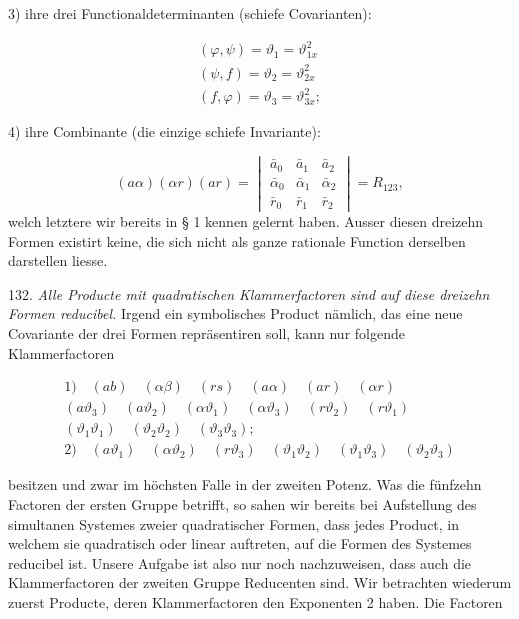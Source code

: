 \documentclass[11pt]{article}
\providecommand{\weberpage}[1]{}
\providecommand{\weq}[2]{\begin{equation}\tag{#1}#2\end{equation}}
\begin{document}
3) ihre drei Functionaldeterminanten (schiefe Covarianten):

\[
\begin{gathered}
(\varphi,\psi) = \vartheta_1 = \vartheta_{1x}^2\\
(\psi,f) = \vartheta_2 = \vartheta_{2x}^2\\
(f,\varphi) = \vartheta_3 = \vartheta_{3x}^2;
\end{gathered}
\]


\weberpage{148}
4) ihre Combinante (die einzige schiefe Invariante):

\[
(a\alpha)(\alpha r)(ar) = \begin{vmatrix} \bar a_0 & \bar a_1 & \bar a_2 \\ \bar\alpha_0 & \bar\alpha_1 & \bar\alpha_2 \\ \bar r_0 & \bar r_1 & \bar r_2 \end{vmatrix} = R_{123},
\]
welch letztere wir bereits in § 1 kennen gelernt haben. Ausser diesen dreizehn
Formen existirt keine, die sich nicht als ganze rationale Function derselben
darstellen liesse.

132. \textit{Alle Producte mit quadratischen Klammerfactoren sind auf diese
dreizehn Formen reducibel.} Irgend ein symbolisches Product nämlich, das eine neue
Covariante der drei Formen repräsentiren soll, kann nur folgende Klammerfactoren

\weq{A}{\begin{gathered}
1)\quad (ab)\quad (\alpha\beta)\quad (rs)\quad (a\alpha)\quad (ar)\quad (\alpha r)\\
(a\vartheta_3)\quad (a\vartheta_2)\quad (\alpha\vartheta_1)\quad (\alpha\vartheta_3)\quad (r\vartheta_2)\quad (r\vartheta_1)\\
(\vartheta_1\vartheta_1)\quad (\vartheta_2\vartheta_2)\quad (\vartheta_3\vartheta_3);\\
2)\quad (a\vartheta_1)\quad (\alpha\vartheta_2)\quad (r\vartheta_3)\quad (\vartheta_1\vartheta_2)\quad (\vartheta_1\vartheta_3)\quad (\vartheta_2\vartheta_3)
\end{gathered}}

besitzen und zwar im höchsten Falle in der zweiten Potenz. Was die fünfzehn
Factoren der ersten Gruppe betrifft, so sahen wir bereits bei Aufstellung des
simultanen Systemes zweier quadratischer Formen, dass jedes Product, in welchem
sie quadratisch oder linear auftreten, auf die Formen des Systemes reducibel ist.
Unsere Aufgabe ist also nur noch nachzuweisen, dass auch die Klammerfactoren der
zweiten Gruppe Reducenten sind. Wir betrachten wiederum zuerst Producte, deren
Klammerfactoren den Exponenten 2 haben. Die Factoren
\end{document}
